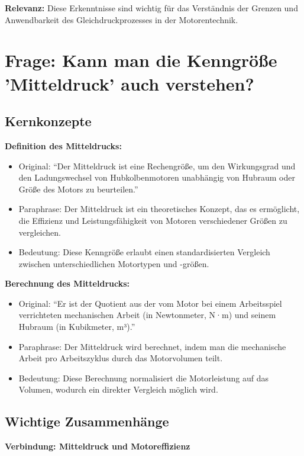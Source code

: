 \documentclass[a4paper,12pt]{article}
\begin{document}
\textbf{Relevanz:} Diese Erkenntnisse sind wichtig für das Verständnis der Grenzen und Anwendbarkeit des Gleichdruckprozesses in der Motorentechnik.

\section{Frage: Kann man die Kenngröße 'Mitteldruck' auch verstehen?}

\subsection{Kernkonzepte}

\textbf{Definition des Mitteldrucks:}

\begin{itemize}
    \item Original: \enquote{Der Mitteldruck ist eine Rechengröße, um den Wirkungsgrad und den Ladungswechsel von Hubkolbenmotoren unabhängig von Hubraum oder Größe des Motors zu beurteilen.}
    \item Paraphrase: Der Mitteldruck ist ein theoretisches Konzept, das es ermöglicht, die Effizienz und Leistungsfähigkeit von Motoren verschiedener Größen zu vergleichen.
    \item Bedeutung: Diese Kenngröße erlaubt einen standardisierten Vergleich zwischen unterschiedlichen Motortypen und -größen.
\end{itemize}

\textbf{Berechnung des Mitteldrucks:}

\begin{itemize}
    \item Original: \enquote{Er ist der Quotient aus der vom Motor bei einem Arbeitsspiel verrichteten mechanischen Arbeit (in Newtonmeter, N·m) und seinem Hubraum (in Kubikmeter, m³).}
    \item Paraphrase: Der Mitteldruck wird berechnet, indem man die mechanische Arbeit pro Arbeitszyklus durch das Motorvolumen teilt.
    \item Bedeutung: Diese Berechnung normalisiert die Motorleistung auf das Volumen, wodurch ein direkter Vergleich möglich wird.
\end{itemize}

\subsection{Wichtige Zusammenhänge}

\textbf{Verbindung: Mitteldruck und Motoreffizienz}
\end{document}
